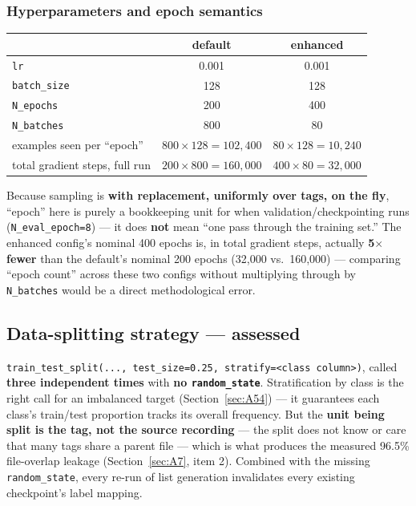 \documentclass[11pt]{article}
\begin{document}
\subsubsection{Hyperparameters and epoch semantics}

\begin{table}[h]
\centering
\begin{tabular}{l c c}
\toprule
 & default & enhanced \\
\midrule
\texttt{lr} & 0.001 & 0.001 \\
\texttt{batch\_size} & 128 & 128 \\
\texttt{N\_epochs} & 200 & 400 \\
\texttt{N\_batches} & 800 & 80 \\
examples seen per ``epoch'' & $800\times128=102{,}400$ & $80\times128=10{,}240$ \\
total gradient steps, full run & $200\times800=160{,}000$ & $400\times80=32{,}000$ \\
\bottomrule
\end{tabular}
\end{table}

Because sampling is \textbf{with replacement, uniformly over tags, on the
fly}, ``epoch'' here is purely a bookkeeping unit for when
validation/checkpointing runs (\texttt{N\_eval\_epoch=8}) --- it does
\textbf{not} mean ``one pass through the training set.'' The enhanced
config's nominal 400 epochs is, in total gradient steps, actually
\textbf{5$\times$ fewer} than the default's nominal 200 epochs
(32{,}000 vs.\ 160{,}000) --- comparing ``epoch count'' across these two
configs without multiplying through by \texttt{N\_batches} would be a
direct methodological error.

\subsection{Data-splitting strategy --- assessed}
\label{sec:B4}

\texttt{train\_test\_split(..., test\_size=0.25, stratify=<class column>)},
called \textbf{three independent times} with \textbf{no
\texttt{random\_state}}. Stratification by class is the right call for an
imbalanced target (Section~\ref{sec:A54}) --- it guarantees each class's
train/test proportion tracks its overall frequency. But the \textbf{unit
being split is the tag, not the source recording} --- the split does not
know or care that many tags share a parent file --- which is what produces
the measured 96.5\% file-overlap leakage (Section~\ref{sec:A7}, item 2).
Combined with the missing \texttt{random\_state}, every re-run of list
generation invalidates every existing checkpoint's label mapping.
\end{document}
